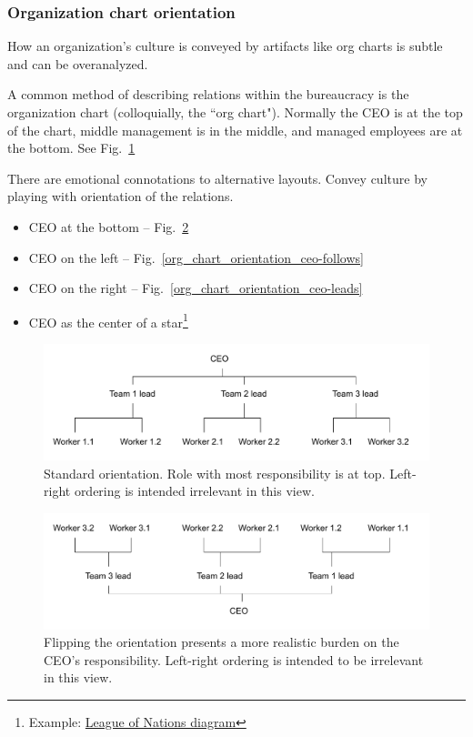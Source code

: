 \subsubsection{Organization chart orientation
\label{org-chart-orientation}}

How an organization's culture is conveyed by artifacts like org charts is subtle and can be overanalyzed. 

A common method of describing relations within the bureaucracy is the organization chart (colloquially, the ``org chart"). Normally the CEO is at the top of the chart, middle management is in the middle, and managed employees are at the bottom. See Fig.~\ref{org_chart_orientation_ceo-at-top} 

There are emotional connotations to alternative layouts. Convey culture by playing with orientation of the relations.

\begin{itemize}
\item CEO at the bottom -- Fig.~\ref{org_chart_orientation_ceo-at-bottom}
\item CEO on the left -- Fig.~\ref{org_chart_orientation_ceo-follows}
\item CEO on the right -- Fig.~\ref{org_chart_orientation_ceo-leads}
\item CEO as the center of a star\footnote{Example: \href{https://en.wikipedia.org/wiki/File:League_of_Nations_Organization.png}{League of Nations diagram}}
\end{itemize}


\begin{figure}
\includegraphics[width=1\textwidth]{images/org-chart-orientation-ceo-at-top.pdf}
\caption{Standard orientation. Role with most responsibility is at top. Left-right ordering is intended irrelevant in this view.}
\label{org_chart_orientation_ceo-at-top}
\end{figure}

\begin{figure}
\includegraphics[width=1\textwidth]{images/org-chart-orientation-ceo-at-bottom.pdf}
\caption{Flipping the orientation presents a more realistic burden on the CEO's responsibility. Left-right ordering is intended to be irrelevant in this view.}
\label{org_chart_orientation_ceo-at-bottom}
\end{figure}

